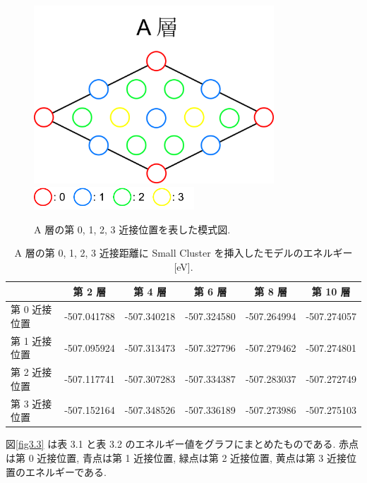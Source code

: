 \begin{figure}[htbp]
	\begin{center}
		\includegraphics[width=90mm]{../method/Alayer.png}
		\includegraphics[width=60mm]{../method/AClayer.png}
		\caption{A 層の第 0, 1, 2, 3 近接位置を表した模式図.}
		\label{fig3.2}
	\end{center}
\end{figure}

\begin{table}[H]
\caption{A 層の第 0, 1, 2, 3 近接距離に Small Cluster を挿入したモデルのエネルギー [eV].}
  \begin{center}
    \begin{tabular}{|l|c|c|c|c|c|} \hline
         & 第 2 層 & 第 4 層 & 第 6 層 & 第 8 層 & 第 10 層\\ \hline
第 0 近接位置 & -507.041788 & -507.340218 & -507.324580 & -507.264994 & -507.274057\\
\hline
第 1 近接位置 & -507.095924 & -507.313473 & -507.327796 & -507.279462 & -507.274801\\
\hline
第 2 近接位置 & -507.117741 & -507.307283 & -507.334387 & -507.283037 & -507.272749\\
\hline
第 3 近接位置 & -507.152164 & -507.348526 & -507.336189 & -507.273986 & -507.275103\\
\hline
    \end{tabular}
  \end{center}
\end{table}

図\ref{fig3.3} は表 3.1 と表 3.2 のエネルギー値をグラフにまとめたものである. 赤点は第 0 近接位置, 青点は第 1 近接位置, 緑点は第 2 近接位置, 黄点は第 3 近接位置のエネルギーである.

